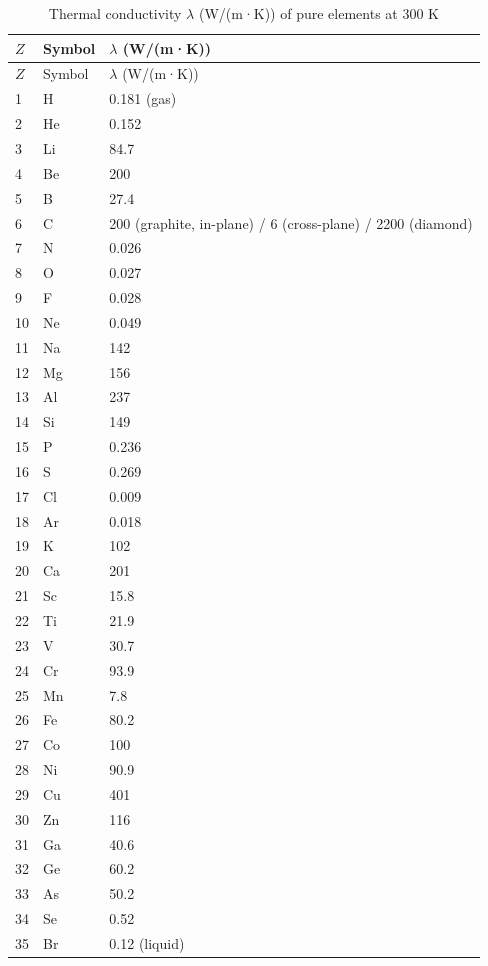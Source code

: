 \documentclass[12pt,a4paper]{article}
\begin{document}
	\begin{longtable}{p{0.6cm}p{1.2cm}p{1.5cm}}
		\caption{Thermal conductivity \(\lambda\) (W/(m·K)) of pure elements at 300 K} \label{tab:thermal-conductivity-all} \\
		\toprule
		\(Z\) & Symbol & \(\lambda\) (W/(m·K)) \\
		\midrule
		\endfirsthead
		\toprule
		\(Z\) & Symbol & \(\lambda\) (W/(m·K)) \\
		\midrule
		\endhead
		1  & H  & 0.181 (gas) \\
		2  & He & 0.152 \\
		3  & Li & 84.7 \\
		4  & Be & 200 \\
		5  & B  & 27.4 \\
		6  & C  & 200 (graphite, in-plane) / 6 (cross-plane) / 2200 (diamond) \\
		7  & N  & 0.026 \\
		8  & O  & 0.027 \\
		9  & F  & 0.028 \\
		10 & Ne & 0.049 \\
		11 & Na & 142 \\
		12 & Mg & 156 \\
		13 & Al & 237 \\
		14 & Si & 149 \\
		15 & P  & 0.236 \\
		16 & S  & 0.269 \\
		17 & Cl & 0.009 \\
		18 & Ar & 0.018 \\
		19 & K  & 102 \\
		20 & Ca & 201 \\
		21 & Sc & 15.8 \\
		22 & Ti & 21.9 \\
		23 & V  & 30.7 \\
		24 & Cr & 93.9 \\
		25 & Mn & 7.8 \\
		26 & Fe & 80.2 \\
		27 & Co & 100 \\
		28 & Ni & 90.9 \\
		29 & Cu & 401 \\
		30 & Zn & 116 \\
		31 & Ga & 40.6 \\
		32 & Ge & 60.2 \\
		33 & As & 50.2 \\
		34 & Se & 0.52 \\
		35 & Br & 0.12 (liquid) \\

\end{longtable}
\end{document}
